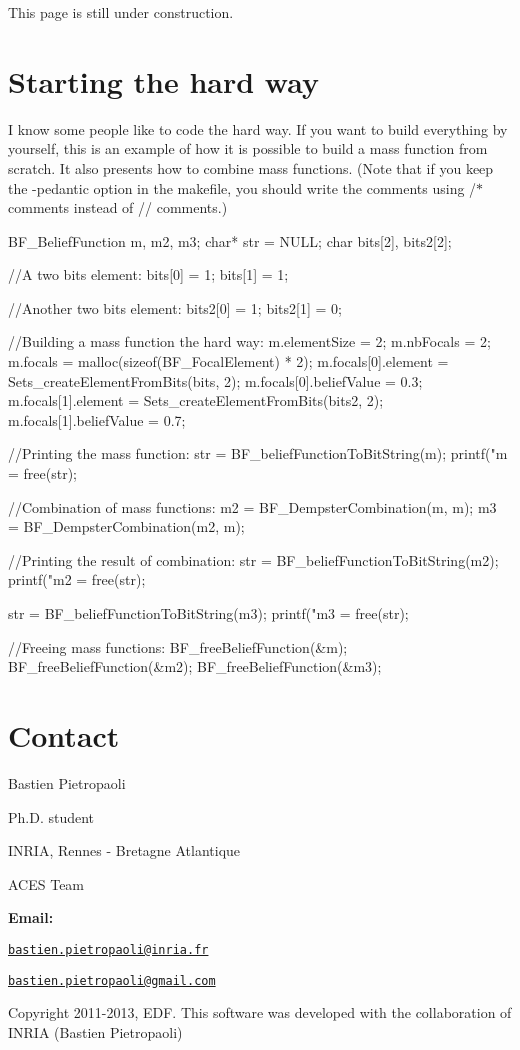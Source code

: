 This page is still under construction.\hypertarget{_tuto_page_ref_hard}{}\section{Starting the hard way}\label{_tuto_page_ref_hard}
I know some people like to code the hard way. If you want to build everything by yourself, this is an example of how it is possible to build a mass function from scratch. It also presents how to combine mass functions. (Note that if you keep the -\/pedantic option in the makefile, you should write the comments using /$\ast$ comments instead of // comments.) 
\begin{DoxyCode}
 BF_BeliefFunction m, m2, m3;
 char* str = NULL;
 char bits[2], bits2[2];

 //A two bits element:
 bits[0] = 1;
 bits[1] = 1;
 
 //Another two bits element: 
 bits2[0] = 1;
 bits2[1] = 0;
 
 //Building a mass function the hard way: 
 m.elementSize = 2;
 m.nbFocals = 2;
 m.focals = malloc(sizeof(BF_FocalElement) * 2);
 m.focals[0].element = Sets_createElementFromBits(bits, 2);
 m.focals[0].beliefValue = 0.3;
 m.focals[1].element = Sets_createElementFromBits(bits2, 2);
 m.focals[1].beliefValue = 0.7;
 
 //Printing the mass function: 
 str = BF_beliefFunctionToBitString(m);
 printf("m = \n%
 free(str);
 
 //Combination of mass functions: 
 m2 = BF_DempsterCombination(m, m);
 m3 = BF_DempsterCombination(m2, m);
 
 //Printing the result of combination: 
 str = BF_beliefFunctionToBitString(m2);
 printf("m2 = \n%
 free(str);
 
 str = BF_beliefFunctionToBitString(m3);
 printf("m3 = \n%
 free(str);
 
 //Freeing mass functions: 
 BF_freeBeliefFunction(&m);
 BF_freeBeliefFunction(&m2);
 BF_freeBeliefFunction(&m3);
\end{DoxyCode}
\hypertarget{_tuto_page_Tuto_contact}{}\section{Contact}\label{_tuto_page_Tuto_contact}
Bastien Pietropaoli \par
 Ph.D. student \par
 INRIA, Rennes -\/ Bretagne Atlantique \par
 ACES Team \par


{\bfseries Email:} \par
 \href{mailto:bastien.pietropaoli@inria.fr}{\tt bastien.pietropaoli@inria.fr} \par
 \href{mailto:bastien.pietropaoli@gmail.com}{\tt bastien.pietropaoli@gmail.com} \par


Copyright 2011-\/2013, EDF. This software was developed with the collaboration of INRIA (Bastien Pietropaoli) 